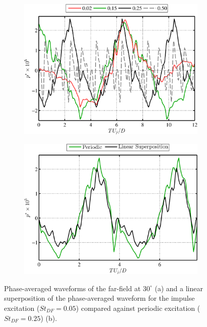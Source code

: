 \begin{figure}
	\centering
	\begin{subfigure}{.5\textwidth}
		\centering
		\includegraphics[width=0.95\linewidth]{Figures/ch3_farfield_phavg.png}
		\caption{}
		\label{fig:ch3_farfield_phavg}
	\end{subfigure}%
	\begin{subfigure}{.5\textwidth}
		\centering
		\includegraphics[width=0.95\linewidth]{Figures/ch3_farfield_linear.png}
		\caption{}
		\label{fig:ch3_farfield_linear}
	\end{subfigure}
	\caption{Phase-averaged waveforms of the far-field at $30^\circ$ (a) and a linear superposition of the phase-averaged waveform for the impulse excitation ($St_{DF} = 0.05$) compared against periodic excitation ($St_{DF} = 0.25$) (b).}
	\label{fig:ch3_farfield}
\end{figure}

